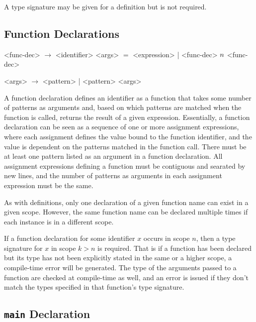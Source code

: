 A type signature may be given for a definition but is not required.

\subsection{Function Declarations}

\begin{grammar}

<func-dec> $\rightarrow$ <identifier> <args> $=$ <expression> |
												 <func-dec> $\\n$ <func-dec>

<args> $\rightarrow$ <pattern> | <pattern> <args>
\end{grammar}

A function declaration defines an identifier as a function that takes
some number of patterns as arguments and, based on which patterns are matched
when the function is called, returns the result
of a given expression. Essentially, a function declaration can be seen as a 
sequence of one or more assignment expressions, where each assignment defines
the value bound to the function identifier, and the value is dependent on the
patterns matched in the function call. There must be at least one pattern listed
as an argument in a function declaration. All assignment expressions defining
a function must be contiguous and searated by new lines, and the number of
patterns as arguments in each assignment expression must be the same.

As with definitions, only one declaration of a given function name can exist
in a given scope. However, the same function name can be declared multiple
times if each instance is in a different scope.

If a function declaration for some identifier $x$ occurs in scope $n$, then
a type signature for $x$ in scope $k>n$ is required. That is if a function has
been declared but its type has not been explicitly stated in the same or a higher
scope, a compile-time error will be generated. The type of the arguments
passed to a function are checked at compile-time as well, and an error
is issued if they don't match the types specified in that function's 
type signature.

\subsection{\texttt{main} Declaration}
